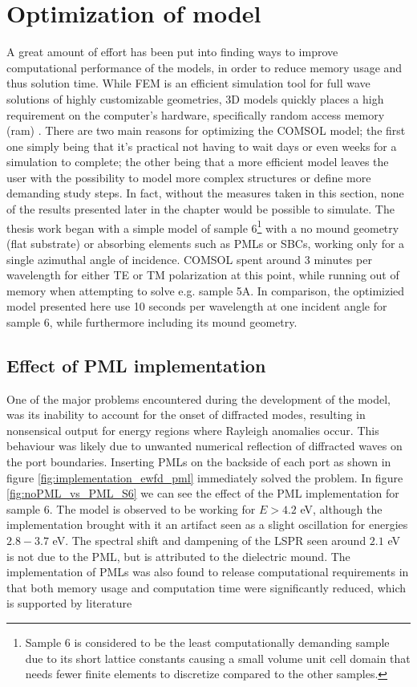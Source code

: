 \section{Optimization of model}
\label{sec:Optimization_of_model}
A great amount of effort has been put into finding ways to improve computational performance of the models, in order to reduce memory usage and thus solution time. While FEM is an efficient simulation tool for full wave solutions of highly customizable geometries, 3D models quickly places a high requirement on the computer's hardware, specifically random access memory (\ac{ram}) \cite{Comsol_RAM_usage}. There are two main reasons for optimizing the COMSOL model; the first one simply being that it's practical not having to wait days or even weeks for a simulation to complete; the other being that a more efficient model leaves the user with the possibility to model more complex structures or define more demanding study steps. In fact, without the measures taken in this section, none of the results presented later in the chapter would be possible to simulate. The thesis work began with a simple model of sample 6\footnote{Sample 6 is considered to be the least computationally demanding sample due to its short lattice constants causing a small volume unit cell domain that needs fewer finite elements to discretize compared to the other samples.} with a no mound geometry (flat substrate) or absorbing elements such as PMLs or SBCs, working only for a single azimuthal angle of incidence. COMSOL spent around 3 minutes per wavelength for either TE or TM polarization at this point, while running out of memory when attempting to solve e.g. sample 5A. In comparison, the optimizied model presented here use 10 seconds per wavelength at one incident angle for sample 6, while furthermore including its mound geometry.





\subsection{Effect of PML implementation}
One of the major problems encountered during the development of the model, was its inability to account for the onset of diffracted modes, resulting in nonsensical output for energy regions where Rayleigh anomalies occur. This behaviour was likely due to unwanted numerical reflection of diffracted waves on the port boundaries. Inserting PMLs on the backside of each port as shown in figure \ref{fig:implementation_ewfd_pml} immediately solved the problem. In figure \ref{fig:noPML_vs_PML_S6} we can see the effect of the PML implementation for sample 6. The model is observed to be working for $E>4.2$ eV, although the implementation brought with it an artifact seen as a slight oscillation for energies $2.8-3.7$ eV. The spectral shift and dampening of the LSPR seen around $2.1$ eV is not due to the PML, but is attributed to the dielectric mound. The implementation of PMLs was also found to release computational requirements in that both memory usage and computation time were significantly reduced, which is supported by literature\cite{PML_Berenger}\cite{PML_Berenger_3D}

